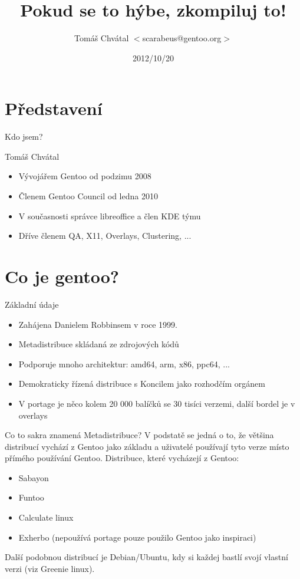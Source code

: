 \documentclass{beamer}
\title{Pokud se to hýbe, zkompiluj to!}
\author[Tomáš Chvátal]{Tomáš Chvátal $<$scarabeus@gentoo.org$>$}
\date{2012/10/20}
\begin{document}
\frame{\titlepage}
\section{Představení}
\begin{frame}{Kdo jsem?}
	\begin{center}Tomáš Chvátal\end{center}
	\begin{itemize}
		\item Vývojářem Gentoo od podzimu 2008
		\item Členem Gentoo Council od ledna 2010
		\item V současnosti správce libreoffice a člen KDE týmu
		\item Dříve členem QA, X11, Overlays, Clustering, ...
	\end{itemize}
\end{frame}
\section{Co je gentoo?}

\begin{frame}{Základní údaje}
	\begin{itemize}
		\item Zahájena Danielem Robbinsem v roce 1999.
		\item Metadistribuce skládaná ze zdrojových kódů
		\item Podporuje mnoho architektur: amd64, arm, x86, ppc64, ...
		\item Demokraticky řízená distribuce s Koncilem jako rozhodčím orgánem
		\item V portage je něco kolem 20 000 balíčků se 30 tisíci verzemi, další bordel je v overlays
	\end{itemize}
\end{frame}

\begin{frame}{Co to sakra znamená Metadistribuce?}
	V podstatě se jedná o to, že většina distribucí vychází z Gentoo jako základu a uživatelé používají tyto verze místo přímého používání Gentoo.
	Distribuce, které vycházejí z Gentoo:
	\begin{itemize}
		\item Sabayon
		\item Funtoo
		\item Calculate linux
		\item Exherbo (nepoužívá portage pouze použilo Gentoo jako inspiraci)
	\end{itemize}
	Další podobnou distribucí je Debian/Ubuntu, kdy si každej  bastlí svojí vlastní verzi (viz Greenie linux).
\end{frame}
\end{document}
